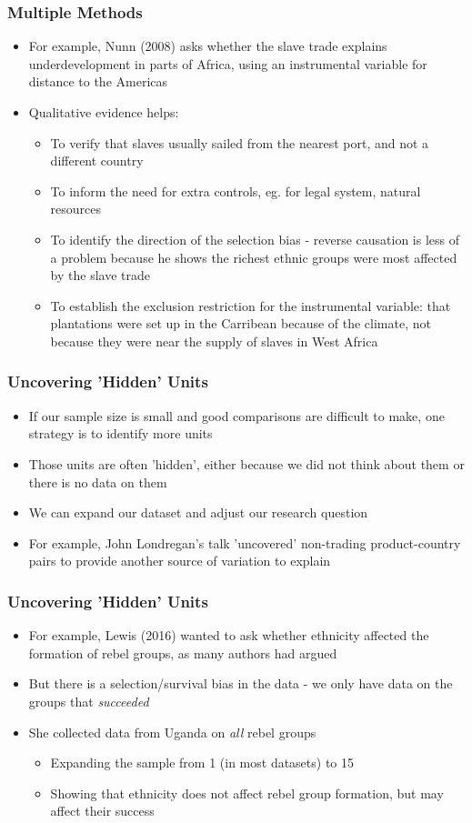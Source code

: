 \documentclass[xcolor=x11names,compress]{beamer}\usepackage[]{graphicx}\usepackage[]{color}
\renewcommand{\(}{\begin{columns}}
\renewcommand{\)}{\end{columns}}
\newcommand{\<}[1]{\begin{column}{#1}}
\renewcommand{\>}{\end{column}}
\begin{document}
\begin{frame}
\frametitle{Multiple Methods}
\begin{itemize}
\item For example, Nunn (2008) asks whether the slave trade explains underdevelopment in parts of Africa, using an instrumental variable for distance to the Americas
\item Qualitative evidence helps:
\begin{itemize}
\item To verify that slaves usually sailed from the nearest port, and not a different country
\item To inform the need for extra controls, eg. for legal system, natural resources
\item To identify the direction of the selection bias - reverse causation is less of a problem because he shows the richest ethnic groups were most affected by the slave trade
\item To establish the exclusion restriction for the instrumental variable: that plantations were set up in the Carribean because of the climate, not because they were near the supply of slaves in West Africa
\end{itemize}
\end{itemize}
\end{frame}

\begin{frame}
\frametitle{Uncovering 'Hidden' Units}
\begin{itemize}
\item If our sample size is small and good comparisons are difficult to make, one strategy is to identify more units
\item Those units are often 'hidden', either because we did not think about them or there is no data on them
\item We can expand our dataset and adjust our research question
\item For example, John Londregan's talk 'uncovered' non-trading product-country pairs to provide another source of variation to explain
\end{itemize}
\end{frame}

\begin{frame}
\frametitle{Uncovering 'Hidden' Units}
\begin{itemize}
\item For example, Lewis (2016) wanted to ask whether ethnicity affected the formation of rebel groups, as many authors had argued
\item But there is a selection/survival bias in the data - we only have data on the groups that \textit{succeeded}
\item She collected data from Uganda on \textit{all} rebel groups
\begin{itemize}
\item Expanding the sample from 1 (in most datasets) to 15
\item Showing that ethnicity does not affect rebel group formation, but may affect their success
\end{itemize}
\end{itemize}
\end{frame}
\end{document}
